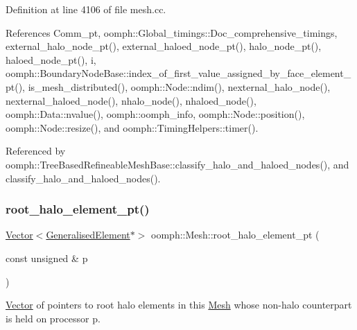Definition at line 4106 of file mesh.\+cc.



References Comm\+\_\+pt, oomph\+::\+Global\+\_\+timings\+::\+Doc\+\_\+comprehensive\+\_\+timings, external\+\_\+halo\+\_\+node\+\_\+pt(), external\+\_\+haloed\+\_\+node\+\_\+pt(), halo\+\_\+node\+\_\+pt(), haloed\+\_\+node\+\_\+pt(), i, oomph\+::\+Boundary\+Node\+Base\+::index\+\_\+of\+\_\+first\+\_\+value\+\_\+assigned\+\_\+by\+\_\+face\+\_\+element\+\_\+pt(), is\+\_\+mesh\+\_\+distributed(), oomph\+::\+Node\+::ndim(), nexternal\+\_\+halo\+\_\+node(), nexternal\+\_\+haloed\+\_\+node(), nhalo\+\_\+node(), nhaloed\+\_\+node(), oomph\+::\+Data\+::nvalue(), oomph\+::oomph\+\_\+info, oomph\+::\+Node\+::position(), oomph\+::\+Node\+::resize(), and oomph\+::\+Timing\+Helpers\+::timer().



Referenced by oomph\+::\+Tree\+Based\+Refineable\+Mesh\+Base\+::classify\+\_\+halo\+\_\+and\+\_\+haloed\+\_\+nodes(), and classify\+\_\+halo\+\_\+and\+\_\+haloed\+\_\+nodes().

\mbox{\label{classoomph_1_1Mesh_af4545acc3277128e010ce88609fc21dd}} 
\subsubsection{\texorpdfstring{root\+\_\+halo\+\_\+element\+\_\+pt()}{root\_halo\_element\_pt()}\hspace{0.1cm}{\footnotesize\ttfamily [1/2]}}
{\footnotesize\ttfamily \hyperlink{classoomph_1_1Vector}{Vector}$<$\hyperlink{classoomph_1_1GeneralisedElement}{Generalised\+Element}$\ast$$>$ oomph\+::\+Mesh\+::root\+\_\+halo\+\_\+element\+\_\+pt (\begin{DoxyParamCaption}\item[{const unsigned \&}]{p }\end{DoxyParamCaption})\hspace{0.3cm}{\ttfamily [inline]}}



\hyperlink{classoomph_1_1Vector}{Vector} of pointers to root halo elements in this \hyperlink{classoomph_1_1Mesh}{Mesh} whose non-\/halo counterpart is held on processor p. 



